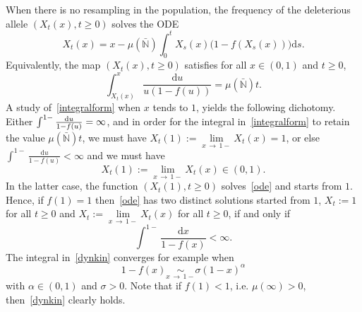 \documentclass[10pt]{amsart}
\theoremstyle{definition}\newtheorem{defi}[theo]{Definition}\newtheorem{rema}[theo]{Remark}\newtheorem{exam}[theo]{Example}\newtheorem{exem}[theo]{Example}\newtheorem{nota}[theo]{Notation}
\newcommand{\ddr}{\mathrm{d}}
\newcommand{\bbN}{\mathbb{N}}
\begin{document}
When there is no resampling in the population, the frequency of the deleterious allele $(X_t(x),t\geq 0)$ solves the ODE
\begin{equation}\label{ode}
X_{t}(x)=x-\mu(\bar{\bbN})\int_{0}^{t}X_s(x)\big(1-f(X_s(x))\big)\ddr s.
\end{equation}
Equivalently, the map $(X_t(x),t\geq 0)$ satisfies for all $x\in (0,1)$ and $t\geq 0$,
\begin{equation}\label{integralform}
\int_{X_t(x)}^{x}\frac{\ddr u}{u(1-f(u))}=\mu(\bar{\bbN})t.
\end{equation}
A study of~\eqref{integralform} when $x$ tends to $1$, yields the following dichotomy. Either $\int^{1-}\frac{\ddr u}{1-f(u)}\linebreak=\infty$, and in order for the integral in~\eqref{integralform} to retain the value $\mu(\bar{\bbN})t$, we must have $X_t(1):=\underset{x\,\rightarrow\,1-}{\lim}X_t(x)=1$, or else $\int^{1-}\frac{\ddr u}{1-f(u)}<\infty$ and we must have
\[
X_t(1):=\underset{x\,\rightarrow\,1-}{\lim}X_t(x)\in (0,1).
\]
In the latter case, the function $(X_t(1),t\geq 0)$ solves~\eqref{ode} and starts from $1$. Hence, if $f(1)=1$ then~\eqref{ode} has two distinct solutions started from $1$, $X_t:=1$ for all $t\geq 0$ and $X_t:=\underset{x\,\rightarrow\,1-}{\lim} X_t(x)$ for all $t\geq 0$, if and only if
\begin{equation}\label{dynkin}
\int^{1-} \frac{\ddr x}{1-f(x)}<\infty.
\end{equation}
The integral in~\eqref{dynkin} converges for example when
\[
1-f(x)\underset{x\,\rightarrow\,1-}{\sim} \sigma (1-x)^{\alpha}
\]
with $\alpha\in (0,1)$ and $\sigma>0$. Note that if $f(1)<1$, i.e. $\mu(\infty)>0$, then~\eqref{dynkin} clearly holds.
\end{document}
